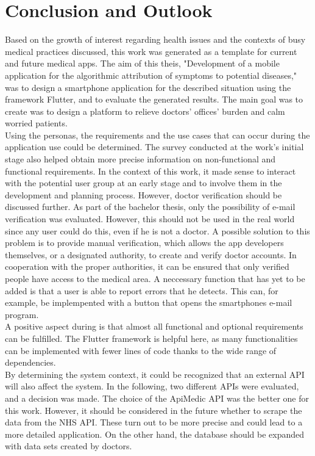 \chapter{Conclusion and Outlook}
Based on the growth of interest regarding health issues and the contexts of busy medical practices discussed, this work was generated as a template for current and future medical apps.
The aim of this theis, "Development of a mobile application for the algorithmic attribution of symptoms to potential diseases," was to design a smartphone application for the described situation using the framework Flutter, and to evaluate the generated results. The main goal was to create was to design a platform to relieve doctors' offices' burden and calm worried patients. 
\newline \\
Using the personas, the requirements and the use cases that can occur during the application use could be determined. The survey conducted at the work's initial stage also helped obtain more precise information on non-functional and functional requirements. In the context of this work, it made sense to interact with the potential user group at an early stage and to involve them in the development and planning process. However, doctor verification should be discussed further. As part of the bachelor thesis, only the possibility of e-mail verification was evaluated. However, this should not be used in the real world since any user could do this, even if he is not a doctor. A possible solution to this problem is to provide manual verification, which allows the app developers themselves, or a designated authority, to create and verify doctor accounts. In cooperation with the proper authorities, it can be ensured that only verified people have access to the medical area. A neccessary function that has yet to be added is that a user is able to report errors that he detects. This can, for example, be implempented with a button that opens the smartphones e-mail program.
\newline \\
A positive aspect during is that almost all functional and optional requirements can be fulfilled. The Flutter framework is helpful here, as many functionalities can be implemented with fewer lines of code thanks to the wide range of dependencies.
\newline \\
By determining the system context, it could be recognized that an external API will also affect the system. In the following, two different APIs were evaluated, and a decision was made. The choice of the ApiMedic API was the better one for this work. However, it should be considered in the future whether to scrape the data from the NHS API. These turn out to be more precise and could lead to a more detailed application. On the other hand, the database should be expanded with data sets created by doctors. 

